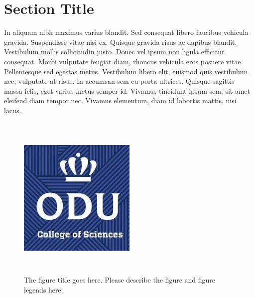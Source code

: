 \documentclass[12pt]{report}
\begin{document}
\section{Section Title}
In aliquam nibh maximus varius blandit. Sed consequat libero faucibus vehicula gravida. Suspendisse vitae nisi ex. Quisque gravida risus ac dapibus blandit. Vestibulum mollis sollicitudin justo. Donec vel ipsum non ligula efficitur consequat. Morbi vulputate feugiat diam, rhoncus vehicula eros posuere vitae. Pellentesque sed egestas metus. Vestibulum libero elit, euismod quis vestibulum nec, vulputate at risus. In accumsan sem eu porta ultrices. Quisque sagittis massa felis, eget varius metus semper id. Vivamus tincidunt ipsum sem, sit amet eleifend diam tempor nec. Vivamus elementum, diam id lobortis mattis, nisi lacus.


\begin{figure}[tb] %
  \centering
  \includegraphics[height=8cm, width=0.5\textwidth]{Figures/cos1.jpeg}
  \caption[The figure title goes here.]{The figure title goes here. Please describe the figure and figure legends here.}
  \label{fig:cos1}
\end{figure}

\end{document}
